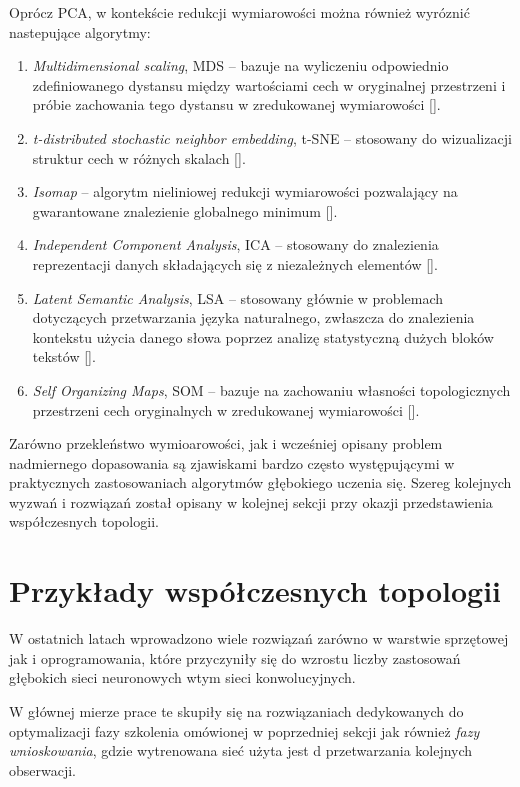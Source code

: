 Oprócz PCA, w kontekście redukcji wymiarowości można również wyróznić nastepujące algorytmy: 
\begin{enumerate}
	\item \textit{Multidimensional scaling}, MDS -- bazuje na wyliczeniu odpowiednio zdefiniowanego dystansu między wartościami cech w oryginalnej przestrzeni i próbie zachowania tego dystansu w zredukowanej wymiarowości [].
	\item \textit{t-distributed stochastic neighbor embedding}, t-SNE -- stosowany do wizualizacji struktur cech w różnych skalach [].
	\item \textit{Isomap} -- algorytm nieliniowej redukcji wymiarowości pozwalający na gwarantowane znalezienie globalnego minimum []. 
	\item \textit{Independent Component Analysis}, ICA -- stosowany do znalezienia reprezentacji danych składających się z niezależnych elementów [].
	\item \textit{Latent Semantic Analysis}, LSA -- stosowany głównie w problemach dotyczących przetwarzania języka naturalnego, zwłaszcza do znalezienia kontekstu użycia danego słowa poprzez analizę statystyczną dużych bloków tekstów []. 
	\item \textit{Self Organizing Maps}, SOM --  bazuje na zachowaniu własności topologicznych przestrzeni cech oryginalnych w zredukowanej wymiarowości [].
\end{enumerate}

Zarówno przekleństwo wymioarowości, jak i wcześniej opisany problem nadmiernego dopasowania są zjawiskami bardzo często występującymi w praktycznych zastosowaniach algorytmów głębokiego uczenia się. Szereg kolejnych wyzwań i rozwiązań został opisany w kolejnej sekcji przy okazji przedstawienia współczesnych topologii.

\section{Przykłady współczesnych topologii}

W ostatnich latach wprowadzono wiele rozwiązań zarówno w warstwie sprzętowej jak i oprogramowania, które przyczyniły się do wzrostu liczby zastosowań głębokich sieci neuronowych wtym sieci konwolucyjnych. 

W głównej mierze prace te skupiły się na rozwiązaniach dedykowanych do optymalizacji fazy szkolenia omówionej w poprzedniej sekcji jak również \textit{fazy wnioskowania}, gdzie wytrenowana sieć użyta jest d przetwarzania kolejnych obserwacji.


